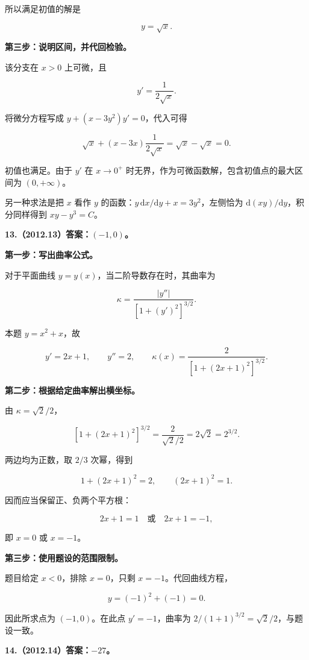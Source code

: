 \documentclass[UTF8,11pt,fontset=windows]{ctexart}
\begin{document}
所以满足初值的解是

$$
y=\sqrt x.
$$

\textbf{第三步：说明区间，并代回检验。}

该分支在 $x>0$ 上可微，且

$$
y'=\frac1{2\sqrt x}.
$$

将微分方程写成 $y+(x-3y^2)y'=0$，代入可得

$$
\sqrt x+(x-3x)\frac1{2\sqrt x}
=\sqrt x-\sqrt x=0.
$$

初值也满足。由于 $y'$ 在 $x\to0^+$ 时无界，作为可微函数解，包含初值点的最大区间为 $(0,+\infty)$。

另一种求法是把 $x$ 看作 $y$ 的函数：$y\,\mathrm dx/\mathrm dy+x=3y^2$，左侧恰为 $\mathrm d(xy)/\mathrm dy$，积分同样得到 $xy-y^3=C$。

\clearpage

\textbf{13.（2012.13）答案：$(-1,0)$。}

\textbf{第一步：写出曲率公式。}

对于平面曲线 $y=y(x)$，当二阶导数存在时，其曲率为

$$
\kappa=\frac{|y''|}{[1+(y')^2]^{3/2}}.
$$

本题 $y=x^2+x$，故

$$
y'=2x+1,
\qquad y''=2,
\qquad
\kappa(x)=\frac2{[1+(2x+1)^2]^{3/2}}.
$$

\textbf{第二步：根据给定曲率解出横坐标。}

由 $\kappa=\sqrt2/2$，

$$
[1+(2x+1)^2]^{3/2}
=\frac2{\sqrt2/2}
=2\sqrt2=2^{3/2}.
$$

两边均为正数，取 $2/3$ 次幂，得到

$$
1+(2x+1)^2=2,
\qquad (2x+1)^2=1.
$$

因而应当保留正、负两个平方根：

$$
2x+1=1\quad\text{或}\quad2x+1=-1,
$$

即 $x=0$ 或 $x=-1$。

\textbf{第三步：使用题设的范围限制。}

题目给定 $x<0$，排除 $x=0$，只剩 $x=-1$。代回曲线方程，

$$
y=(-1)^2+(-1)=0.
$$

因此所求点为 $(-1,0)$。在此点 $y'=-1$，曲率为 $2/(1+1)^{3/2}=\sqrt2/2$，与题设一致。

\clearpage

\textbf{14.（2012.14）答案：$-27$。}
\end{document}
